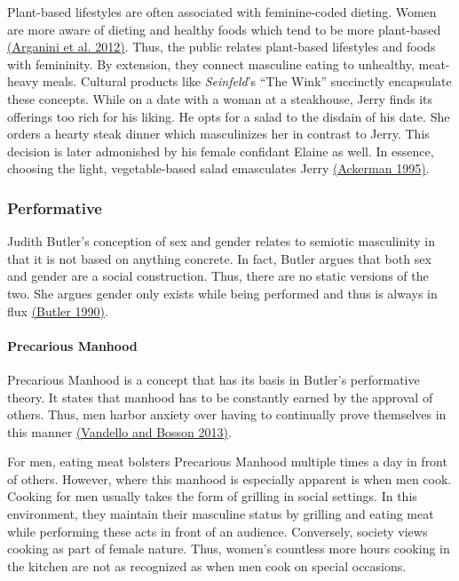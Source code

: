 \documentclass[twoside]{report}
\begin{document}
Plant-based lifestyles are often associated with feminine-coded dieting.
Women are more aware of dieting and healthy foods which tend to
be more plant-based \hyperlink{arganini}{(Arganini et al. 2012)}. Thus, the public relates plant-based lifestyles and foods with femininity. By extension, they connect masculine eating to unhealthy, meat-heavy meals. Cultural products like \emph{Seinfeld}'s ``The Wink'' succinctly
encapsulate these concepts. While on a date with a woman at a
steakhouse, Jerry finds its offerings too rich for his liking. He opts
for a salad to the disdain of his date. She orders a hearty steak dinner which masculinizes her in contrast to Jerry. This decision is later
admonished by his female confidant Elaine as well. In
essence, choosing the light, vegetable-based salad emasculates Jerry \hyperlink{ackerman}{(Ackerman 1995)}.

\subsubsection{Performative}

Judith Butler's conception of sex and gender relates to semiotic
masculinity in that it is not based on anything concrete. In fact,
Butler argues that both sex and gender are a social construction. Thus,
there are no static versions of the two. She argues gender only
exists while being performed and thus is always in flux \hyperlink{butler}{(Butler 1990)}.

\paragraph{Precarious Manhood}

Precarious Manhood is a concept that has its basis in Butler's
performative theory. It states that manhood has to be constantly earned
by the approval of others. Thus, men harbor anxiety over having to
continually prove themselves in this manner \hyperlink{vandello}{(Vandello and Bosson 2013)}.

For men, eating meat bolsters Precarious Manhood multiple times a day in front of others. However, where this manhood is especially apparent is when men cook. Cooking for men usually takes the form of grilling in social settings. In this environment, they maintain their masculine status by grilling and eating meat while performing these acts in front of an audience. Conversely, society views cooking as part of female nature. Thus, women's countless more hours cooking in the kitchen are not as recognized as when men cook on special occasions.
\end{document}

